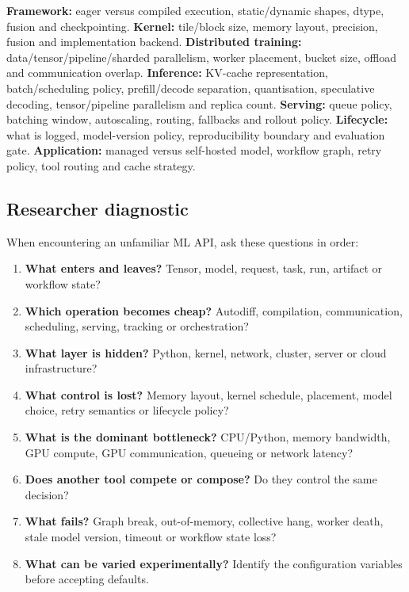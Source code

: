 \begin{calloutdegreeexperiment}
\textbf{Framework:} eager versus compiled execution, static/dynamic shapes, dtype, fusion and checkpointing.
\newline
\textbf{Kernel:} tile/block size, memory layout, precision, fusion and implementation backend.
\newline
\textbf{Distributed training:} data/tensor/pipeline/sharded parallelism, worker placement, bucket size, offload and communication overlap.
\newline
\textbf{Inference:} KV-cache representation, batch/scheduling policy, prefill/decode separation, quantisation, speculative decoding, tensor/pipeline parallelism and replica count.
\newline
\textbf{Serving:} queue policy, batching window, autoscaling, routing, fallbacks and rollout policy.
\newline
\textbf{Lifecycle:} what is logged, model-version policy, reproducibility boundary and evaluation gate.
\newline
\textbf{Application:} managed versus self-hosted model, workflow graph, retry policy, tool routing and cache strategy.
\end{calloutdegreeexperiment}


\subsection{Researcher diagnostic}

When encountering an unfamiliar ML API, ask these questions in order:

\begin{enumerate}
\item \textbf{What enters and leaves?} Tensor, model, request, task, run, artifact or workflow state?
\item \textbf{Which operation becomes cheap?} Autodiff, compilation, communication, scheduling, serving, tracking or orchestration?
\item \textbf{What layer is hidden?} Python, kernel, network, cluster, server or cloud infrastructure?
\item \textbf{What control is lost?} Memory layout, kernel schedule, placement, model choice, retry semantics or lifecycle policy?
\item \textbf{What is the dominant bottleneck?} CPU/Python, memory bandwidth, GPU compute, GPU communication, queueing or network latency?
\item \textbf{Does another tool compete or compose?} Do they control the same decision?
\item \textbf{What fails?} Graph break, out-of-memory, collective hang, worker death, stale model version, timeout or workflow state loss?
\item \textbf{What can be varied experimentally?} Identify the configuration variables before accepting defaults.
\end{enumerate}

